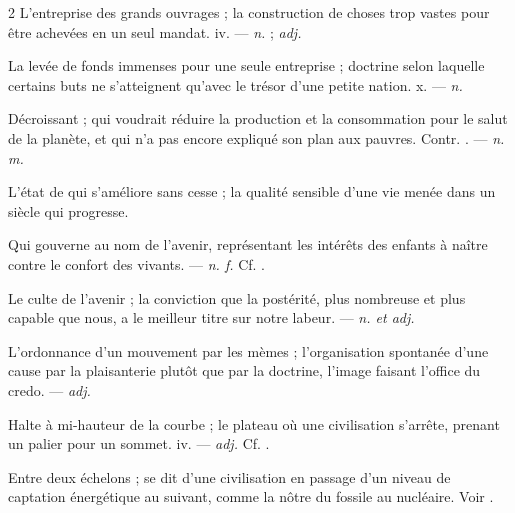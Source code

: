 \begin{multicols}{2}
 L'entreprise des grands ouvrages ; la construction de choses trop vastes pour être achevées en un seul mandat.   iv. —  \textit{n.} ;  \textit{adj.}

 La levée de fonds immenses pour une seule entreprise ; doctrine selon laquelle certains buts ne s'atteignent qu'avec le trésor d'une petite nation.   x. —  \textit{n.}

 Décroissant ; qui voudrait réduire la production et la consommation pour le salut de la planète, et qui n'a pas encore expliqué son plan aux pauvres. Contr. . —  \textit{n. m.}

 L'état de qui s'améliore sans cesse ; la qualité sensible d'une vie menée dans un siècle qui progresse.

 Qui gouverne au nom de l'avenir, représentant les intérêts des enfants à naître contre le confort des vivants. —  \textit{n. f.} Cf. .

 Le culte de l'avenir ; la conviction que la postérité, plus nombreuse et plus capable que nous, a le meilleur titre sur notre labeur. —  \textit{n. et adj.}

 L'ordonnance d'un mouvement par les mèmes ; l'organisation spontanée d'une cause par la plaisanterie plutôt que par la doctrine, l'image faisant l'office du credo. —  \textit{adj.}

 Halte à mi-hauteur de la courbe ; le plateau où une civilisation s'arrête, prenant un palier pour un sommet.   iv. —  \textit{adj.} Cf. .

 Entre deux échelons ; se dit d'une civilisation en passage d'un niveau de captation énergétique au suivant, comme la nôtre du fossile au nucléaire. Voir .


\end{multicols}
